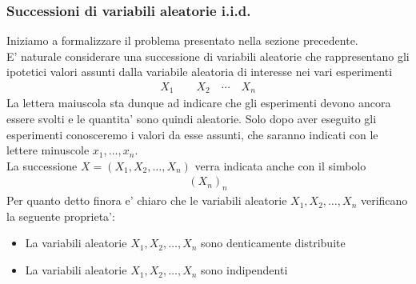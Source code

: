 \documentclass[a4paper,12pt]{article}
\begin{document}
\subsubsection{Successioni di variabili aleatorie i.i.d.}
Iniziamo a formalizzare il problema presentato nella sezione precedente.\\
E' naturale considerare una successione di variabili aleatorie
che rappresentano gli ipotetici valori assunti dalla variabile aleatoria di interesse nei vari
esperimenti
\begin{align}
  X_1 \qquad X_2 \quad \cdots \quad X_n
\end{align}
La lettera maiuscola sta dunque ad indicare che gli esperimenti devono ancora essere svolti
e le quantita' sono quindi aleatorie. Solo dopo aver eseguito gli esperimenti conosceremo
i valori da esse assunti, che saranno indicati con le lettere minuscole $x_1, \ldots, x_n$.\\
La successione $X = (X_1, X_2, \ldots, X_n)$ verra indicata anche con il simbolo
\begin{align}
  (X_n)_n
\end{align}
Per quanto detto finora e' chiaro che le variabili aleatorie $X_1, X_2, \ldots, X_n$ verificano la seguente proprieta':
\begin{itemize}
  \item La variabili aleatorie $X_1, X_2, \ldots, X_n$ sono denticamente distribuite 
  \item La variabili aleatorie $X_1, X_2, \ldots, X_n$ sono indipendenti
\end{itemize}
\\
\vspace{1px}\\
\end{document}
